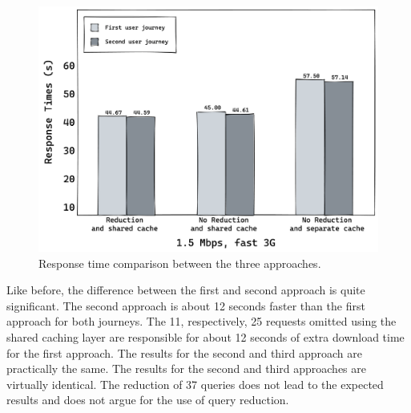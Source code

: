 
\ifshowImages
\begin{figure}[H]
  \centering
  \includegraphics[width=0.9\linewidth]{images/discussion/response-times.png}
  \caption{Response time comparison between the three approaches.}\label{fig:discussion:response-times}
\end{figure}
\fi

\noindent Like before, the difference between the first and second approach is quite significant. The second approach is about 12 seconds faster than the first approach for both journeys. The 11, respectively, 25 requests omitted using the shared caching layer are responsible for about 12 seconds of extra download time for the first approach. The results for the second and third approach are practically the same. The results for the second and third approaches are virtually identical. The reduction of 37 queries does not lead to the expected results and does not argue for the use of query reduction.